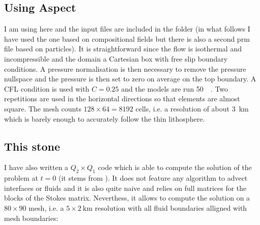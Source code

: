 \subsection*{Using Aspect}

I am using here \aspect and the input files are included in the folder (in 
what follows I have used the one based on compositional fields but there
is also a second prm file based on particles). It is straightforward 
since the flow is isothermal and incompressible and the domain a Cartesian box with 
free slip boundary conditions. A pressure normalisation is then necessary to remove 
the pressure nullspace and the pressure is then set to zero on average on the top boundary. 
A CFL condition is used with $C=0.25$ and the models 
are run 50~\si{\mega\year}. 
Two repetitions are used in the horizontal directions so that elements are almost square.
The mesh counts $128\times 64=8192$ cells, i.e. a resolution of about 3~\si{\km} which is barely enough to 
accurately follow the thin lithosphere.


\subsection*{This stone}

I have also written a $Q_2\times Q_1$ code which is able to 
compute the solution of the problem at $t=0$ (it stems from ). 
It does not feature any algorithm to advect interfaces or fluids and
it is also quite naive and relies on full matrices for the 
blocks of the Stokes matrix. Neverthess, it allows to compute the solution 
on a $80\times 90$ mesh, i.e. a $5\times 2~\si{\km}$ resolution with 
all fluid boundaries alligned with mesh boundaries:

